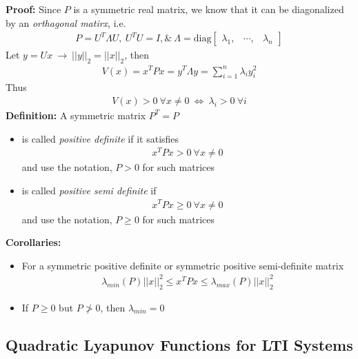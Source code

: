 \documentclass[twoside]{article}
\begin{document}
\textbf{Proof:} Since $P$ is a symmetric real matrix, we know that it can be diagonalized by an
\textit{orthagonal matirx}, i.e.
%
\begin{align*}
P = U^T \Lambda U , \ U^T U = I , \& \ \Lambda = 
\mathrm{diag}\begin{bmatrix} \lambda_1 , & \cdots , & \lambda_n  \end{bmatrix}
\end{align*}
%
Let $y = U x \ \rightarrow \ || y ||_2 = || x ||_2$, then
%
\begin{align*}
V(x) = x^T P x  = y^T \Lambda y = \sum\limits_{i=1}^n \lambda_i y_i^2 
\end{align*}
%
Thus
%
\begin{align*}
V(x) > 0 \ \forall x \neq 0 \ \iff \ \lambda_i > 0 \ \forall i 
\end{align*}
%
\textbf{Definition:} A symmetric matrix $P^T = P$ 
\begin{itemize}
    \item is called \textit{positive definite} if it satisfies 
%
\begin{align*}
x^T P x > 0 \ \forall x \neq 0
\end{align*}
%
and use the notation, $P > 0$ for such matrices
%
\item is called \textit{positive semi definite} if 
%
\begin{align*}
x^T P x \geq 0 \ \forall x \neq 0
\end{align*}
%
and use the notation, $P \geq 0$ for such matrices
\end{itemize}

\textbf{Corollaries:} 
\begin{itemize}
\item For a symmetric positive definite or symmetric positive semi-definite matrix 
%
\begin{align*}
 \lambda_{min}(P) || x ||_2^2 \leq x^T P x \leq \lambda_{max}(P) || x ||_2^2
\end{align*}
%
\item If $P \geq 0$ but $P \not> 0$, then $\lambda_{min} = 0$ 
\end{itemize}

\subsection{Quadratic Lyapunov Functions for LTI Systems}
\end{document}
